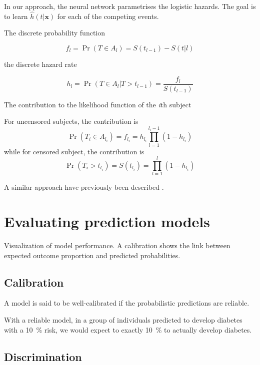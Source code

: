 In our approach, the neural network parametrises the logistic hazards.
The goal is to learn \( \hat{h}(t | \mathbf{x}) \)
for each of the competing events.




The discrete probability function

\begin{equation}
    f_l = \Pr (T \in A_l) = S(t_{l-1}) - S(t|l)
\end{equation}

the discrete hazard rate

\begin{equation}
    h_l = \Pr (T \in A_l | T > t_{l-1}) = \frac{f_l}{S(t_{l-1})}
\end{equation}

    
The contribution to the likelihood function of the \textit{i}th subject

For uncensored subjects, the contribution is
%
\begin{equation}
    \Pr (T_i \in A_{l_i}) = f_{l_i} = h_{l_i} \prod_{l=1}^{l_i-1}(1-h_{l_i})
\end{equation}
%
while for censored subject, the contribution is
%
\begin{equation}
    \Pr (T_i > t_{l_i}) = S(t_{l_i}) = \prod_{l=1}^{l}(1-h_{l_i})
\end{equation}

A similar approach have previously been described \autocite{biganzoliFeed1998}.




\section{Evaluating prediction models}

Visualization of model performance.
A calibration shows the link between 
expected outcome proportion 
and predicted probabilities.

\subsection{Calibration}

A model is said to be well-calibrated
if the probabilistic predictions are reliable.

With a reliable model, 
in a group of individuals predicted to develop diabetes
with a \SI{10}{\percent} risk, 
we would expect to exactly \SI{10}{\percent} to actually develop diabetes.


\subsection{Discrimination}

